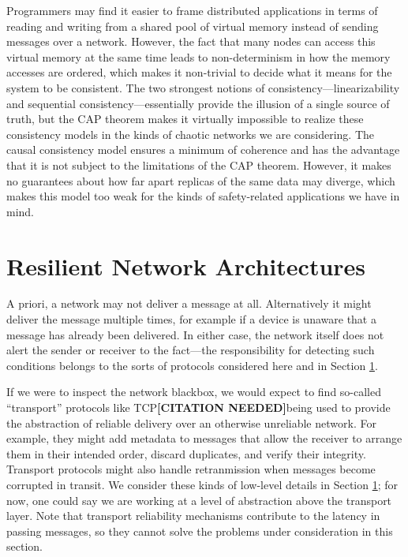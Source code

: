\documentclass[]             %
{NASA}                       %
\theoremstyle{definition}
\newcommand{\citationneeded}{\textbf{[CITATION NEEDED]}}
\begin{document}
Programmers may find it easier to frame distributed applications in
terms of reading and writing from a shared pool of virtual memory
instead of sending messages over a network. However, the fact that
many nodes can access this virtual memory at the same time leads to
non-determinism in how the memory accesses are ordered, which makes it
non-trivial to decide what it means for the system to be
consistent. The two strongest notions of consistency---linearizability
and sequential consistency---essentially provide the illusion of a
single source of truth, but the CAP theorem makes it virtually
impossible to realize these consistency models in the kinds of chaotic
networks we are considering. The causal consistency model ensures a
minimum of coherence and has the advantage that it is not subject to
the limitations of the CAP theorem. However, it makes no guarantees
about how far apart replicas of the same data may diverge, which makes
this model too weak for the kinds of safety-related applications we
have in mind.

\section{Resilient Network Architectures}
\label{sec:networking}



A priori, a network may not deliver a message at all. Alternatively it
might deliver the message multiple times, for example if a device is
unaware that a message has already been delivered. In either case, the
network itself does not alert the sender or receiver to the fact---the
responsibility for detecting such conditions belongs to the sorts of
protocols considered here and in Section \ref{sec:networking}.

If we were to inspect the network blackbox, we would expect to find
so-called ``transport'' protocols like TCP\citationneeded being used
to provide the abstraction of reliable delivery over an otherwise
unreliable network. For example, they might add metadata to messages
that allow the receiver to arrange them in their intended order,
discard duplicates, and verify their integrity. Transport protocols
might also handle retranmission when messages become corrupted in
transit. We consider these kinds of low-level details in Section
\ref{sec:networking}; for now, one could say we are working at a level
of abstraction above the transport layer. Note that transport
reliability mechanisms contribute to the latency in passing messages,
so they cannot solve the problems under consideration in this section.
\end{document}
